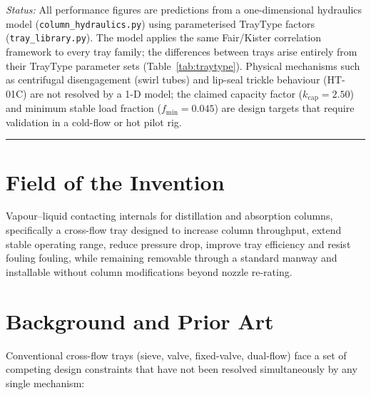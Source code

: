 \documentclass[11pt,letterpaper]{article}
\begin{document}
\noindent\textit{Status:} All performance figures are predictions from a
one-dimensional hydraulics model (\texttt{column\_hydraulics.py}) using
parameterised TrayType factors (\texttt{tray\_library.py}).  The model
applies the same Fair/Kister correlation framework to every tray family;
the differences between trays arise entirely from their TrayType parameter
sets (Table~\ref{tab:traytype}).  Physical mechanisms such as centrifugal
disengagement (swirl tubes) and lip-seal trickle behaviour (HT-01C) are not
resolved by a 1-D model; the claimed capacity factor ($k_{\mathrm{cap}}=2.50$)
and minimum stable load fraction ($f_{\mathrm{min}}=0.045$) are design targets
that require validation in a cold-flow or hot pilot rig.

\hrule\vspace{6pt}

\tableofcontents
\newpage

\section{Field of the Invention}

Vapour--liquid contacting internals for distillation and absorption columns,
specifically a cross-flow tray designed to increase column throughput,
extend stable operating range, reduce pressure drop, improve tray efficiency
and resist fouling fouling, while remaining removable through a standard
manway and installable without column modifications beyond nozzle re-rating.

\section{Background and Prior Art}

Conventional cross-flow trays (sieve, valve, fixed-valve, dual-flow) face a
set of competing design constraints that have not been resolved simultaneously
by any single mechanism:
\end{document}
